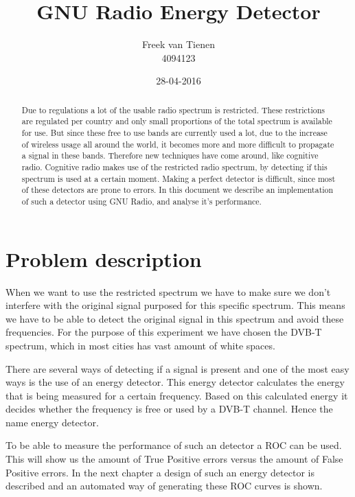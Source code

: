 \documentclass[]{article}
\begin{document}


\title{GNU Radio Energy Detector}
\author{Freek van Tienen \\ 4094123}
\date{28-04-2016}
\maketitle

\begin{abstract}
Due to regulations a lot of the usable radio spectrum is restricted.
These restrictions are regulated per country and only small proportions of the total spectrum is available for use.
But since these free to use bands are currently used a lot, due to the increase of wireless usage all around the world, it becomes more  and more difficult to propagate a signal in these bands.
Therefore new techniques have come around, like cognitive radio.
Cognitive radio makes use of the restricted radio spectrum, by detecting if this spectrum is used at a certain moment.
Making a perfect detector is difficult, since most of these detectors are prone to errors.
In this document we describe an implementation of such a detector using GNU Radio, and analyse it's performance.
\end{abstract}


\section{Problem description}
When we want to use the restricted spectrum we have to make sure we don't interfere with the original signal purposed for this specific spectrum.
This means we have to be able to detect the original signal in this spectrum and avoid these frequencies.
For the purpose of this experiment we have chosen the DVB-T spectrum, which in most cities has vast amount of white spaces.

There are several ways of detecting if a signal is present and one of the most easy ways is the use of an energy detector.
This energy detector calculates the energy that is being measured for a certain frequency.
Based on this calculated energy it decides whether the frequency is free or used by a DVB-T channel.
Hence the name energy detector.

To be able to measure the performance of such an detector a ROC can be used.
This will show us the amount of True Positive errors versus the amount of False Positive errors.
In the next chapter a design of such an energy detector is described and an automated way of generating these ROC curves is shown.
\end{document}
